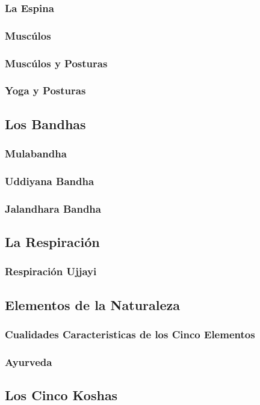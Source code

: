 \documentclass[a4paper]{book}
\begin{document}
\subsubsection{La Espina}
\subsubsection{Muscúlos}
\subsubsection{Muscúlos y Posturas}
\subsubsection{Yoga y Posturas}
\subsection{Los Bandhas}
\subsubsection{Mulabandha}
\subsubsection{Uddiyana Bandha}
\subsubsection{Jalandhara Bandha}
\subsection{La Respiración}
\subsubsection{Respiración Ujjayi}
\subsection{Elementos de la Naturaleza}
\subsubsection{Cualidades Caracteristicas de los Cinco Elementos}
\subsubsection{Ayurveda}
\subsection{Los Cinco Koshas}
\end{document}
